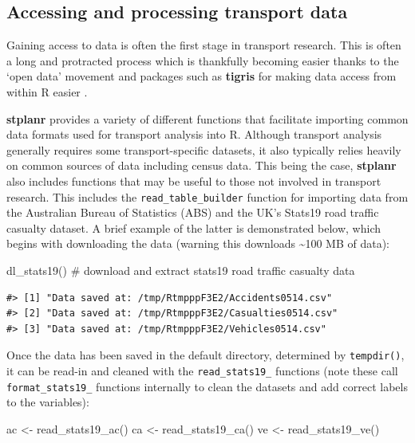 \subsection{Accessing and processing transport
data}\label{accessing-and-processing-transport-data}

Gaining access to data is often the first stage in transport research.
This is often a long and protracted process which is thankfully becoming
easier thanks to the `open data' movement and packages such as
\textbf{tigris} for making data access from within R easier
\citep{walker_tigris:_2016}.

\textbf{stplanr} provides a variety of different functions that
facilitate importing common data formats used for transport analysis
into R. Although transport analysis generally requires some
transport-specific datasets, it also typically relies heavily on common
sources of data including census data. This being the case,
\textbf{stplanr} also includes functions that may be useful to those not
involved in transport research. This includes the
\texttt{read\_table\_builder} function for importing data from the
Australian Bureau of Statistics (ABS) and the UK's Stats19 road traffic
casualty dataset. A brief example of the latter is demonstrated below,
which begins with downloading the data (warning this downloads
\textasciitilde{}100 MB of data):

\begin{Schunk}
\begin{Sinput}
dl_stats19() # download and extract stats19 road traffic casualty data
\end{Sinput}
\end{Schunk}

\begin{verbatim}
#> [1] "Data saved at: /tmp/RtmpppF3E2/Accidents0514.csv"
#> [2] "Data saved at: /tmp/RtmpppF3E2/Casualties0514.csv"
#> [3] "Data saved at: /tmp/RtmpppF3E2/Vehicles0514.csv"
\end{verbatim}

Once the data has been saved in the default directory, determined by
\texttt{tempdir()}, it can be read-in and cleaned with the
\texttt{read\_stats19\_} functions (note these call
\texttt{format\_stats19\_} functions internally to clean the datasets
and add correct labels to the variables):

\begin{Schunk}
\begin{Sinput}
ac <- read_stats19_ac()
ca <- read_stats19_ca()
ve <- read_stats19_ve()
\end{Sinput}
\end{Schunk}

